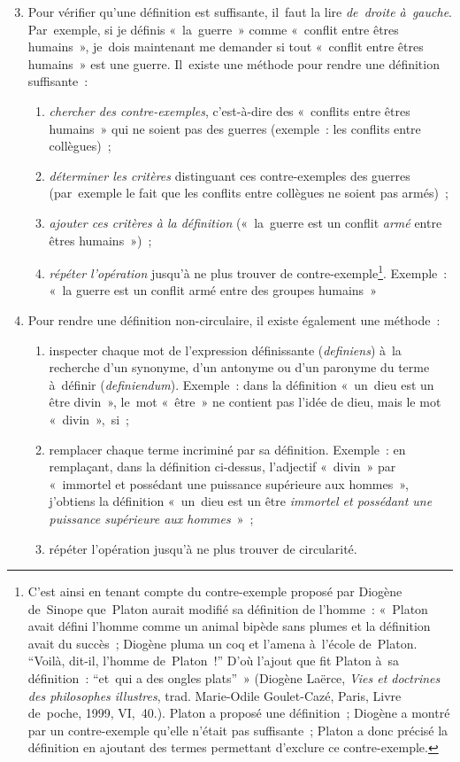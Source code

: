\documentclass[a4paper,12pt]{report}
\begin{document}
\begin{enumerate}
\setcounter{enumi}{2}
\item Pour vérifier qu'une définition est suffisante, il faut la lire
\emph{de droite à gauche}​. Par exemple, si je définis « la guerre » comme
« conflit entre êtres humains », je dois maintenant me demander si
tout « conflit entre êtres humains » est une guerre. Il existe une
méthode pour rendre une définition suffisante :
\begin{enumerate}
\item \emph{chercher des contre-exemples}, c'est-à-dire des « conflits entre
êtres humains » qui ne soient pas des guerres (exemple : les
conflits entre collègues) ;
\item \emph{déterminer les critères} distinguant ces contre-exemples des
guerres (par exemple le fait que les conflits entre collègues ne
soient pas armés) ;
\item \emph{ajouter ces critères à la définition} (« la guerre est un conflit
\emph{armé} entre êtres humains ») ;
\item \emph{répéter l'opération} jusqu'à ne plus trouver de
contre-exemple\footnote{C'est ainsi en tenant compte du contre-exemple proposé par
Diogène de Sinope que Platon aurait modifié sa définition de l'homme :
« Platon avait défini l'homme comme un animal bipède sans plumes et la
définition avait du succès ; Diogène pluma un coq et l'amena à l'école
de Platon. ``Voilà, dit-il, l'homme de Platon !'' D'où l'ajout que fit
Platon à sa définition : ``et qui a des ongles plats'' » (Diogène
Laërce, \emph{Vies et doctrines des philosophes illustres}, trad. Marie-Odile
Goulet-Cazé, Paris, Livre de poche, 1999, VI, 40.). Platon a proposé une
définition ; Diogène a montré par un contre-exemple qu'elle n'était pas
suffisante ; Platon a donc précisé la définition en ajoutant des termes
permettant d'exclure ce contre-exemple.}. Exemple : « la guerre est un conflit armé
entre des groupes humains »
\end{enumerate}

\item Pour rendre une définition non-circulaire, il existe également une
méthode :
\begin{enumerate}
\item inspecter chaque mot de l'expression définissante (\emph{definiens}​)
à la recherche d'un synonyme, d'un antonyme ou d'un paronyme du
terme à définir (\emph{definiendum}​). Exemple : dans la définition
« un dieu est un être divin​ », le mot « être » ne contient pas
l'idée de dieu, mais le mot « divin », si ;
\item remplacer chaque terme incriminé par sa définition. Exemple : en
remplaçant, dans la définition ci-dessus, l'adjectif « divin » par
« immortel et possédant une puissance supérieure aux hommes »,
j'obtiens la définition « un dieu est un être \emph{immortel et
possédant une puissance supérieure aux hommes}​ » ;
\item répéter l'opération jusqu'à ne plus trouver de circularité.
\end{enumerate}
\end{enumerate}
\end{document}
